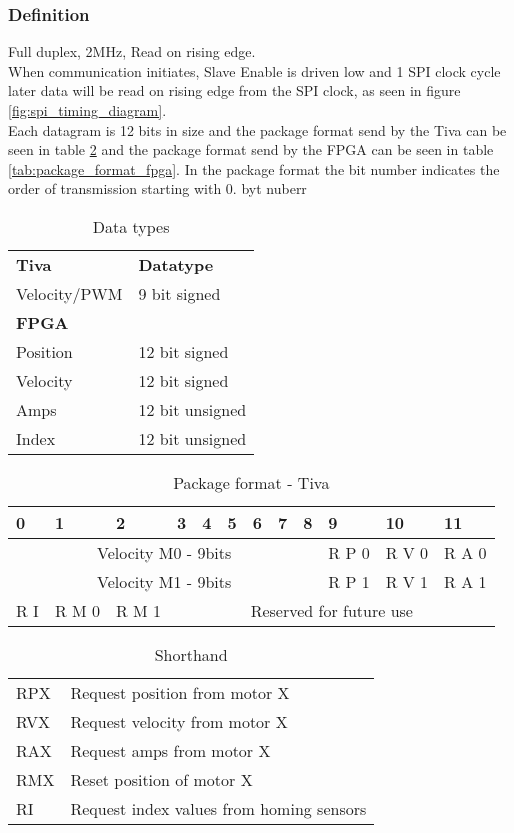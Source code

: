 \documentclass[../../../main]{subfiles}
\begin{document}
\subsubsection{Definition}
\label{sub:definition}
Full duplex, 2MHz, Read on rising edge.
\\
When communication initiates, Slave Enable is driven low and 1 SPI clock cycle later 
data will be read on rising edge from the SPI clock, as seen in figure \ref{fig:spi_timing_diagram}.
\\
Each datagram is 12 bits in size and the package format send by the Tiva 
can be seen in table \ref{tab:package_format_tiva} and the package format send by the FPGA
can be seen in table \ref{tab:package_format_fpga}.
In the package format the bit number indicates the order of transmission starting with 0.
byt nuberr

\begin{table}[h]
	\centering
	\begin{tabular}{ll}
		\textbf{Tiva}& \textbf{Datatype}  \\
		Velocity/PWM& 9 bit signed \\
		\textbf{FPGA}& \\
		Position& 12 bit signed \\
		Velocity& 12 bit signed \\
		Amps& 12 bit unsigned \\
		Index& 12 bit unsigned 
	\end{tabular}
	\caption{Data types}
	\label{tab:spi_datatypes}
\end{table}

\begin{table}[h]
	\centering
	\caption{Package format - Tiva}
	\label{tab:package_format_tiva}
	\begin{tabular}{|*{12}{p{.25cm}|}}
		\hline
		0&1&2&3&4&5&6&7&8&9&10&11\\ 
		\hline
		\multicolumn{9}{|c|}{Velocity M0  - 9bits} & R P 0 & R V 0 & R A 0 \\
		\hline
		\multicolumn{9}{|c|}{Velocity M1  - 9bits} & R P 1 & R V 1 & R A 1 \\
		\hline
		R I & R M 0 & R M 1 & \multicolumn{9}{c|}{Reserved for future use}\\
		\hline
	\end{tabular}
\end{table}
\begin{table}[h]
	\centering
	\caption{Shorthand}
	\label{tab:shorthand}
	\begin{tabular}{ll}
	RPX & Request position from motor X\\
	RVX & Request velocity from motor X\\
	RAX & Request amps from motor X\\
	RMX & Reset position of motor X\\
	RI & Request index values from homing sensors
	\end{tabular}
\end{table}
\end{document}
